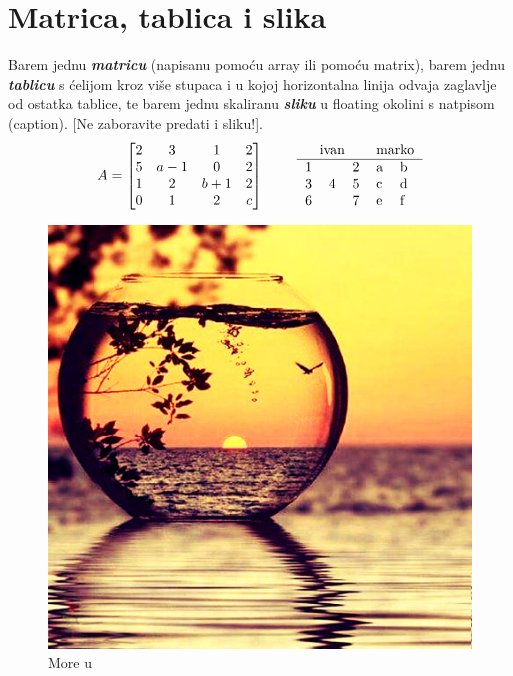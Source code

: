 \documentclass[12pt]{scrartcl}
\newcommand{\BI}[1]{\textbf{\textit{#1}}}
\begin{document}
\section{Matrica, tablica i slika}
Barem jednu \BI{matricu} (napisanu pomoću array ili pomoću matrix), barem jednu \BI{tablicu} s ćelijom kroz više stupaca i u kojoj horizontalna linija odvaja zaglavlje od ostatka tablice, te barem jednu skaliranu \BI{sliku} u floating okolini s natpisom (caption). [Ne zaboravite predati i sliku!].
\begin{gather*}
A=\begin{bmatrix}
2   &  3    &  1    & 2 \\
5   & a-1   &  0    & 2 \\
1   &  2    & b+1   & 2 \\
0   &  1    &  2    & c
\end{bmatrix}\qquad
\text{
\begin{tabular}{lclll}
\multicolumn{3}{c}{ivan}   & \multicolumn{2}{c}{marko} \\ \hline
1 & \multirow{3}{*}{4} & 2 & a           & b           \\
3 &                    & 5 & c           & d           \\
6 &                    & 7 & e           & f          
\end{tabular}}
\end{gather*}
\begin{figure}[h]
\caption{More u \Heart}
\begin{center}
\includegraphics[scale=0.6]{slikica}
\end{center}
\end{figure}
\end{document}
